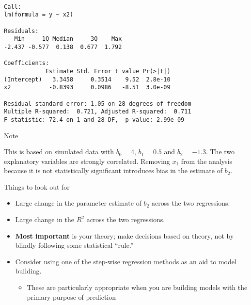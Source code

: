 \documentclass[10pt,ignorenonframetext,]{beamer}
\providecommand{\tightlist}{%
  \setlength{\itemsep}{0pt}\setlength{\parskip}{0pt}}
\begin{document}
\begin{frame}[fragile]

\begin{verbatim}

Call:
lm(formula = y ~ x2)

Residuals:
   Min     1Q Median     3Q    Max 
-2.437 -0.577  0.138  0.677  1.792 

Coefficients:
            Estimate Std. Error t value Pr(>|t|)
(Intercept)   3.3458     0.3514    9.52  2.8e-10
x2           -0.8393     0.0986   -8.51  3.0e-09

Residual standard error: 1.05 on 28 degrees of freedom
Multiple R-squared:  0.721, Adjusted R-squared:  0.711 
F-statistic: 72.4 on 1 and 28 DF,  p-value: 2.99e-09
\end{verbatim}

\end{frame}

\begin{frame}{Note}

This is based on simulated data with \(b_0=4\), \(b_1=0.5\) and
\(b_2 = -1.3\). The two explanatory variables are strongly correlated.
Removing \(x_1\) from the analysis because it is not statistically
significant introduces bias in the estimate of \(b_2\).

\end{frame}

\begin{frame}{Things to look out for}

\begin{itemize}
\tightlist
\item
  Large change in the parameter estimate of \(b_2\) across the two
  regressions.
\item
  Large change in the \(R^2\) across the two regressions.
\item
  \textbf{Most important} is your theory; make decisions based on
  theory, not by blindly following some statistical ``rule.''
\item
  Consider using one of the step-wise regression methods as an aid to
  model building.

  \begin{itemize}
  \tightlist
  \item
    These are particularly appropriate when you are building models with
    the primary purpose of prediction
  \end{itemize}
\end{itemize}

\end{frame}
\end{document}
